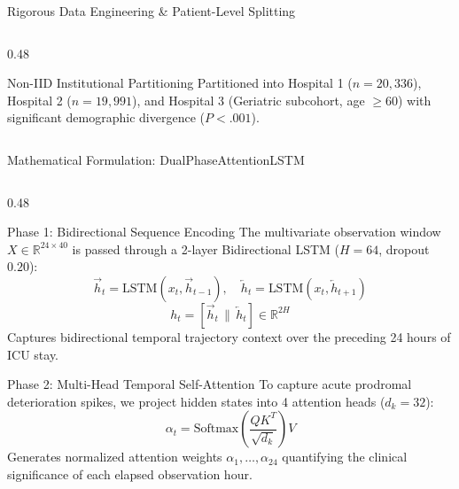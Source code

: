\documentclass[aspectratio=169, 10pt]{beamer}
\begin{document}
\begin{frame}{Rigorous Data Engineering \& Patient-Level Splitting}
\begin{columns}[t]
\begin{column}{0.48\textwidth}
            \begin{exampleblock}{Non-IID Institutional Partitioning}
                \scriptsize
                Partitioned into Hospital 1 ($n=20,336$), Hospital 2 ($n=19,991$), and Hospital 3 (Geriatric subcohort, age $\ge 60$) with significant demographic divergence ($P < .001$).
            \end{exampleblock}
        \end{column}
    \end{columns}
\end{frame}

\begin{frame}{Mathematical Formulation: DualPhaseAttentionLSTM}
    \begin{columns}[t]
        \begin{column}{0.48\textwidth}
            \begin{block}{Phase 1: Bidirectional Sequence Encoding}
                \scriptsize
                The multivariate observation window $X \in \mathbb{R}^{24 \times 40}$ is passed through a 2-layer Bidirectional LSTM ($H=64$, dropout $0.20$):
                \begin{equation*}
                    \overrightarrow{h}_t = \text{LSTM}(x_t, \overrightarrow{h}_{t-1}), \quad \overleftarrow{h}_t = \text{LSTM}(x_t, \overleftarrow{h}_{t+1})
                \end{equation*}
                \begin{equation*}
                    h_t = [\overrightarrow{h}_t \,\|\, \overleftarrow{h}_t] \in \mathbb{R}^{2H}
                \end{equation*}
                Captures bidirectional temporal trajectory context over the preceding 24 hours of ICU stay.
            \end{block}
            
            \begin{block}{Phase 2: Multi-Head Temporal Self-Attention}
                \scriptsize
                To capture acute prodromal deterioration spikes, we project hidden states into 4 attention heads ($d_k = 32$):
                \begin{equation*}
                    \alpha_t = \text{Softmax}\left(\frac{Q K^T}{\sqrt{d_k}}\right) V
                \end{equation*}
                Generates normalized attention weights $\alpha_1, \dots, \alpha_{24}$ quantifying the clinical significance of each elapsed observation hour.
            \end{block}
        \end{column}
        

\end{columns}
\end{frame}
\end{document}
